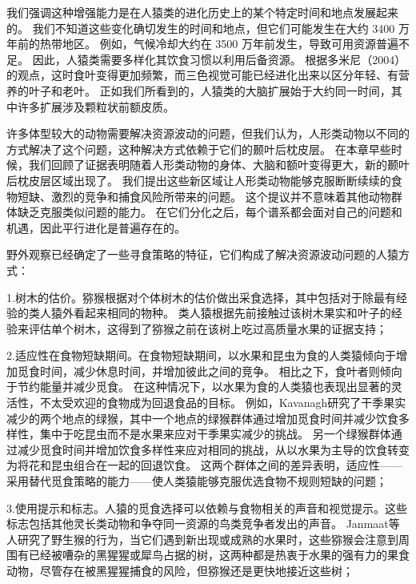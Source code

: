 我们强调这种增强能力是在人猿类的进化历史上的某个特定时间和地点发展起来的。
我们不知道这些变化确切发生的时间和地点，但它们可能发生在大约 3400 万年前的热带地区。
例如，气候冷却大约在 3500 万年前发生，导致可用资源普遍不足。
因此，人猿类需要多样化其饮食习惯以利用后备资源。
根据多米尼（2004）的观点，这时食叶变得更加频繁\cite{kirk2001diets}，而三色视觉可能已经进化出来以区分年轻、有营养的叶子和老叶。
正如我们所看到的，人猿类的大脑扩展始于大约同一时间，其中许多扩展涉及颗粒状前额皮质。


许多体型较大的动物需要解决资源波动的问题，但我们认为，人形类动物以不同的方式解决了这个问题，这种解决方式依赖于它们的颞叶后枕皮层。
在本章早些时候，我们回顾了证据表明随着人形类动物的身体、大脑和额叶变得更大，新的颞叶后枕皮层区域出现了。
我们提出这些新区域让人形类动物能够克服断断续续的食物短缺、激烈的竞争和捕食风险所带来的问题。
这个提议并不意味着其他动物群体缺乏克服类似问题的能力。
在它们分化之后，每个谱系都会面对自己的问题和机遇，因此平行进化是普遍存在的。


野外观察已经确定了一些寻食策略的特征，它们构成了解决资源波动问题的人猿方式：\par

1.树木的估价。猕猴根据对个体树木的估价做出采食选择，其中包括对于除最有经验的类人猿外看起来相同的物种\cite{zuberbuhler2010foraging}。
类人猿根据先前接触过该树木果实和叶子的经验来评估单个树木，这得到了猕猴之前在该树上吃过高质量水果的证据支持\cite{janmaat2006primates}；\par

2.适应性在食物短缺期间。在食物短缺期间，以水果和昆虫为食的人类猿倾向于增加觅食时间，减少休息时间，并增加彼此之间的竞争\cite{kavanagh1978diet}。
相比之下，食叶者则倾向于节约能量并减少觅食。
在这种情况下，以水果为食的人类猿也表现出显著的灵活性，不太受欢迎的食物成为回退食品的目标。
例如，Kavanagh\cite{kavanagh1978diet}研究了干季果实减少的两个地点的绿猴，其中一个地点的绿猴群体通过增加觅食时间并减少饮食多样性，集中于吃昆虫而不是水果来应对干季果实减少的挑战。
另一个绿猴群体通过减少觅食时间并增加饮食多样性来应对相同的挑战，从以水果为主导的饮食转变为将花和昆虫组合在一起的回退饮食。
这两个群体之间的差异表明，适应性——采用替代觅食策略的能力——使人类猿能够克服优选食物不规则短缺的问题；\par

3.使用提示和标志。人猿的觅食选择可以依赖与食物相关的声音和视觉提示。这些标志包括其他灵长类动物和争夺同一资源的鸟类竞争者发出的声音。
Janmaat等人\cite{janmaat2006primates}研究了野生猴的行为，当它们遇到新出现或成熟的水果时，这些猕猴会注意到周围有已经被嘈杂的黑猩猩或犀鸟占据的树，这两种都是热衷于水果的强有力的果食动物，尽管存在被黑猩猩捕食的风险，但猕猴还是更快地接近这些树；\par


